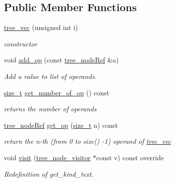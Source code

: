 \subsection*{Public Member Functions}
\begin{DoxyCompactItemize}
\item 
\hyperlink{structtree__vec_a401a3cb1ed09ac4ce6205ca73d331ca1}{tree\+\_\+vec} (unsigned int i)
\begin{DoxyCompactList}\small\item\em constructor \end{DoxyCompactList}\item 
void \hyperlink{structtree__vec_aa82f27505cd577c9c020a344cc5316bb}{add\+\_\+op} (const \hyperlink{tree__node_8hpp_a6ee377554d1c4871ad66a337eaa67fd5}{tree\+\_\+node\+Ref} \&a)
\begin{DoxyCompactList}\small\item\em Add a value to list of operands. \end{DoxyCompactList}\item 
\hyperlink{tutorial__fpt__2017_2intro_2sixth_2test_8c_a7c94ea6f8948649f8d181ae55911eeaf}{size\+\_\+t} \hyperlink{structtree__vec_a0475ef17d838e3b8aafecf70f9ad87df}{get\+\_\+number\+\_\+of\+\_\+op} () const
\begin{DoxyCompactList}\small\item\em returns the number of operands \end{DoxyCompactList}\item 
\hyperlink{tree__node_8hpp_a6ee377554d1c4871ad66a337eaa67fd5}{tree\+\_\+node\+Ref} \hyperlink{structtree__vec_a5076c373efe126f6fbb8c03a57f4db40}{get\+\_\+op} (\hyperlink{tutorial__fpt__2017_2intro_2sixth_2test_8c_a7c94ea6f8948649f8d181ae55911eeaf}{size\+\_\+t} n) const
\begin{DoxyCompactList}\small\item\em return the n-\/th (from 0 to size() -\/1) operand of \hyperlink{structtree__vec}{tree\+\_\+vec} \end{DoxyCompactList}\item 
void \hyperlink{structtree__vec_a6dfe22713c2cb390fe2c35f208d26872}{visit} (\hyperlink{classtree__node__visitor}{tree\+\_\+node\+\_\+visitor} $\ast$const v) const override
\begin{DoxyCompactList}\small\item\em Redefinition of get\+\_\+kind\+\_\+text. \end{DoxyCompactList}\end{DoxyCompactItemize}
